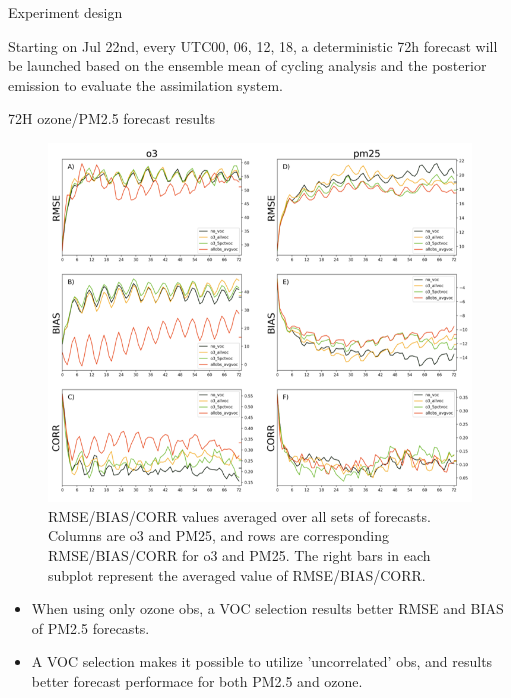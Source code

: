 \documentclass[final]{beamer}
\newlength{\colwidth}
\begin{document}
\begin{frame}[t]
\begin{columns}[t]
\begin{column}{\colwidth}
\begin{block}{Experiment design}
\begin{table}[t]
                \end{table}
                Starting on Jul 22nd, every UTC00, 06, 12, 18, a deterministic 72h forecast will be launched based on the ensemble mean of cycling analysis and the posterior emission to evaluate the assimilation system.
			\end{block}
			
			\begin{alertblock}{72H ozone/PM2.5 forecast results}
				
                \begin{figure}
                    \centerline{\includegraphics[width=0.8\colwidth,angle=0]{figure/fcst72h_00_6hcycle_final.png}}
                    \caption{RMSE/BIAS/CORR values averaged over all sets of forecasts. Columns are o3 and PM25, and rows are corresponding RMSE/BIAS/CORR for o3 and PM25. The right bars in each subplot represent the averaged value of RMSE/BIAS/CORR.}\label{fcst_result}
                \end{figure}
                \begin{itemize}
                    \item When using only ozone obs, a VOC selection results better RMSE and BIAS of PM2.5 forecasts.
                    
                    \item A VOC selection makes it possible to utilize 'uncorrelated' obs, and results better forecast performace for both PM2.5 and ozone.
                \end{itemize}
			\end{alertblock}
			

\end{column}
\end{columns}
\end{frame}
\end{document}
